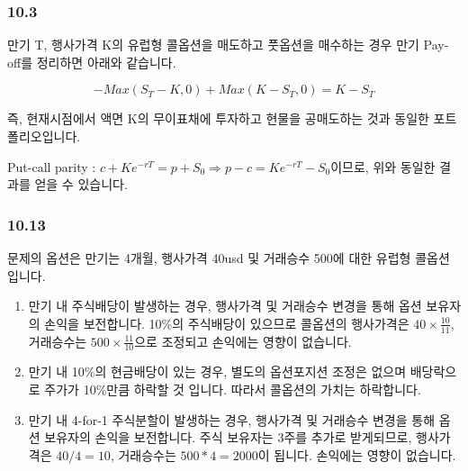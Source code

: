 \documentclass[
  letterpaper,
  DIV=11,
  numbers=noendperiod]{scrreprt}
\begin{document}
\subsubsection*{\texorpdfstring{\textbf{10.3}}{10.3}}\label{section}

만기 T, 행사가격 K의 유럽형 콜옵션을 매도하고 풋옵션을 매수하는 경우
만기 Pay-off를 정리하면 아래와 같습니다.

\[-Max(S_T-K,0)+Max(K-S_T,0)=K-S_T\]

즉, 현재시점에서 액면 K의 무이표채에 투자하고 현물을 공매도하는 것과
동일한 포트폴리오입니다.

\begin{tcolorbox}[enhanced jigsaw, titlerule=0mm, bottomtitle=1mm, left=2mm, title=\textcolor{quarto-callout-tip-color}{\faLightbulb}\hspace{0.5em}{Tip}, toptitle=1mm, bottomrule=.15mm, colframe=quarto-callout-tip-color-frame, breakable, opacityback=0, rightrule=.15mm, opacitybacktitle=0.6, coltitle=black, colback=white, arc=.35mm, colbacktitle=quarto-callout-tip-color!10!white, toprule=.15mm, leftrule=.75mm]

Put-call parity :
\(c+Ke^{-rT}=p+S_0\Rightarrow p-c=Ke^{-rT}-S_0\)이므로, 위와 동일한
결과를 얻을 수 있습니다.

\end{tcolorbox}

\subsubsection*{\texorpdfstring{\textbf{10.13}}{10.13}}\label{section-1}

문제의 옵션은 만기는 4개월, 행사가격 40usd 및 거래승수 500에 대한 유럽형
콜옵션입니다.

\begin{enumerate}
\def\labelenumi{(\alph{enumi})}
\item
  만기 내 주식배당이 발생하는 경우, 행사가격 및 거래승수 변경을 통해
  옵션 보유자의 손익을 보전합니다. 10\%의 주식배당이 있으므로 콜옵션의
  행사가격은 \(40\times\frac{10}{11}\), 거래승수는
  \(500\times\frac{11}{10}\)으로 조정되고 손익에는 영향이 없습니다.
\item
  만기 내 10\%의 현금배당이 있는 경우, 별도의 옵션포지션 조정은 없으며
  배당락으로 주가가 10\%만큼 하락할 것 입니다. 따라서 콜옵션의 가치는
  하락합니다.
\item
  만기 내 4-for-1 주식분할이 발생하는 경우, 행사가격 및 거래승수 변경을
  통해 옵션 보유자의 손익을 보전합니다. 주식 보유자는 3주를 추가로
  받게되므로, 행사가격은 \(40/4=10\), 거래승수는 \(500*4=2000\)이
  됩니다. 손익에는 영향이 없습니다.
\end{enumerate}
\end{document}
